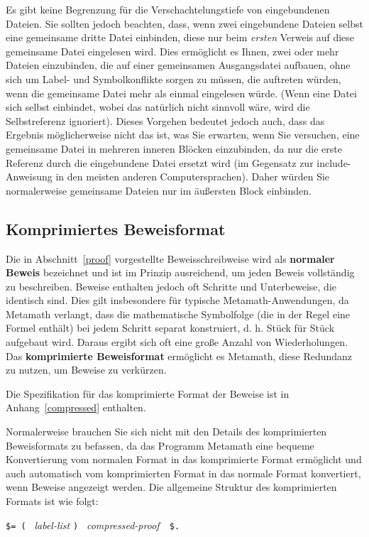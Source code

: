 Es gibt keine Begrenzung für die Verschachtelungstiefe von eingebundenen Dateien.  Sie sollten jedoch beachten, dass, wenn zwei eingebundene Dateien selbst eine gemeinsame dritte Datei einbinden, diese nur beim {\em ersten} Verweis auf diese gemeinsame Datei eingelesen wird.  Dies ermöglicht es Ihnen, zwei oder mehr Dateien einzubinden, die auf einer gemeinsamen Ausgangsdatei aufbauen, ohne sich um Label- und Symbolkonflikte sorgen zu müssen, die auftreten würden, wenn die gemeinsame Datei mehr als einmal eingelesen würde.  (Wenn eine Datei sich selbst einbindet, wobei das natürlich nicht sinnvoll wäre, wird die Selbstreferenz ignoriert).  Dieses Vorgehen bedeutet jedoch auch, dass das Ergebnis möglicherweise nicht das ist, was Sie erwarten, wenn Sie versuchen, eine gemeinsame Datei in mehreren inneren Blöcken einzubinden, da nur die erste Referenz durch die eingebundene Datei ersetzt wird (im Gegensatz zur include-Anweisung in den meisten anderen Computersprachen).  Daher würden Sie normalerweise gemeinsame Dateien nur im äußersten Block einbinden. 

\subsection{Komprimiertes Beweisformat}\label{compressed1}

Die in Abschnitt~\ref{proof} vorgestellte Beweisschreibweise wird als {\bf normaler Beweis} bezeichnet und ist im Prinzip ausreichend, um jeden Beweis vollständig zu beschreiben.  Beweise enthalten jedoch oft Schritte und Unterbeweise, die identisch sind.  Dies gilt insbesondere für typische Metamath-Anwendungen, da Metamath verlangt, dass die mathematische Symbolfolge (die in der Regel eine Formel enthält) bei jedem Schritt separat konstruiert, d. h. Stück für Stück aufgebaut wird. Daraus ergibt sich oft eine große Anzahl von Wiederholungen.  Das {\bf komprimierte Beweisformat} ermöglicht es Metamath, diese Redundanz zu nutzen, um Beweise zu verkürzen.

Die Spezifikation für das komprimierte Format der Beweise ist in Anhang~\ref{compressed} enthalten. 

Normalerweise brauchen Sie sich nicht mit den Details des komprimierten Beweisformats zu befassen, da das Programm Metamath eine bequeme Konvertierung vom normalen Format in das komprimierte Format ermöglicht und auch automatisch vom komprimierten Format in das normale Format konvertiert, wenn Beweise angezeigt werden. Die allgemeine Struktur des komprimierten Formats ist wie folgt:
\begin{center}
  \texttt{\$= ( } {\em label-list} \texttt{) } {\em compressed-proof\ }\ \texttt{\$.}
\end{center}

